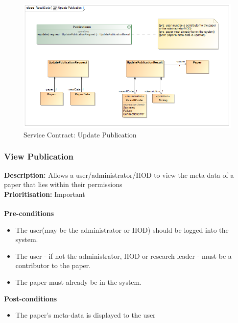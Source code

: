 \documentclass[a4paper]{article}
\begin{document}
        	\begin{figure}[H]
        		\centering
        		\includegraphics[width=\textwidth]{5.1.6.Update.Publication.Services.Contract.png}
        		\caption{Service Contract: Update Publication}
        	\end{figure}
    \pagebreak
    \subsubsection{View Publication}
    
    \textbf{Description:} Allows a user/administrator/HOD to view the meta-data of a paper that lies within their permissions\\
    \textbf{Prioritisation:} Important\\
    \\
    
    \textbf{Pre-conditions}
     \begin{itemize}
        \item The user(may be the administrator or HOD) should be logged into the system.
        \item The user - if not the administrator, HOD or research leader - must be a contributor to the paper.
        \item The paper must already be in the system.
   \end{itemize}
    
    \textbf{Post-conditions}
    \begin{itemize}
        \item The paper's meta-data is displayed to the user
    \end{itemize}
    
\end{document}

